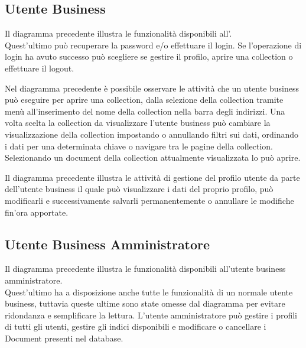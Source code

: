 
\subsection{Utente Business}
Il diagramma precedente illustra le funzionalità disponibili all'.\\
Quest'ultimo può recuperare la password e/o effettuare il login. Se l'operazione di login ha avuto successo può scegliere se gestire il profilo, aprire una collection o effettuare il logout.

Nel diagramma precedente è possibile osservare le attività che un utente business può eseguire per aprire una collection, dalla selezione della collection tramite menù all'inserimento del nome della collection nella barra degli indirizzi.
Una volta scelta la collection da visualizzare l'utente business può cambiare la visualizzazione della collection impostando o annullando filtri sui dati, ordinando i dati per una determinata chiave o navigare tra le pagine della collection.
Selezionando un document della collection attualmente visualizzata lo può aprire.

Il diagramma precedente illustra le attività di gestione del profilo utente da parte dell'utente business il quale può visualizzare i dati del proprio profilo, può modificarli e successivamente salvarli permanentemente o annullare le modifiche fin'ora apportate.

\subsection{Utente Business Amministratore}
Il diagramma precedente illustra le funzionalità disponibili all'utente business amministratore.\\
Quest'ultimo ha a disposizione anche tutte le funzionalità di un normale utente business, tuttavia queste ultime sono state omesse dal diagramma per evitare ridondanza e semplificare la lettura.
L'utente amministratore può gestire i profili di tutti gli utenti, gestire gli indici disponibili e modificare o cancellare i Document presenti nel database.

